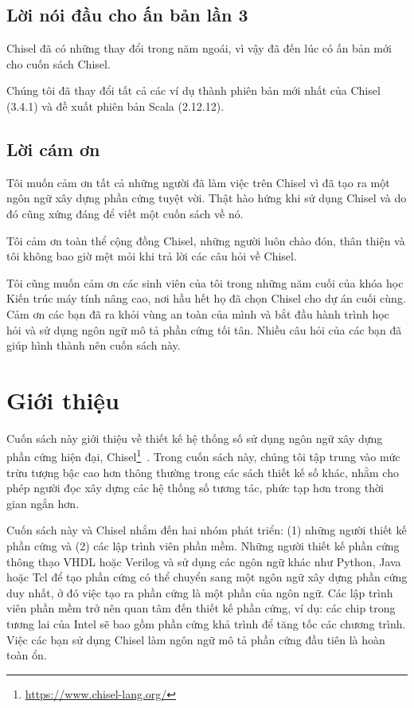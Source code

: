 \documentclass[%
    10pt,
    headinclude, footexclude,
    openright, %
    notitlepage,
    cleardoubleempty,
    headsepline,
    pointlessnumbers,
    bibtotoc, idxtotoc,
    ]{scrbook}
\newcommand{\myref}[2]{\href{#1}{#2}}
\renewcommand{\myref}[2]{{#2}{\footnote{\url{#1}}}}
\begin{document}
\section*{Lời nói đầu cho ấn bản lần 3}

Chisel đã có những thay đổi trong năm ngoái, vì vậy đã đến lúc có ấn bản mới cho cuốn sách Chisel.

Chúng tôi đã thay đổi tất cả các ví dụ thành phiên bản mới nhất của Chisel (3.4.1) và đề xuất phiên bản Scala (2.12.12).

\section*{Lời cám ơn}

Tôi muốn cảm ơn tất cả những người đã làm việc trên Chisel vì đã tạo ra một ngôn ngữ xây dựng phần cứng tuyệt vời. Thật hào hứng khi sử dụng Chisel và do đó cũng xứng đáng để viết một cuốn sách về nó.

Tôi cảm ơn toàn thể cộng đồng Chisel, những người luôn chào đón, thân thiện và tôi không bao giờ mệt mỏi khi trả lời các câu hỏi về Chisel. 

Tôi cũng muốn cảm ơn các sinh viên của tôi trong những năm cuối của khóa học Kiến trúc máy tính nâng cao, nơi hầu hết họ đã chọn Chisel cho dự án cuối cùng.
Cảm ơn các bạn đã ra khỏi vùng an toàn của mình và bắt đầu hành trình học hỏi và sử dụng ngôn ngữ mô tả phần cứng tối tân. Nhiều câu hỏi của các bạn đã giúp hình thành nên cuốn sách này.

\mainmatter

\chapter{Giới thiệu}
\label{sec:intro}

Cuốn sách này giới thiệu về thiết kế hệ thống số sử dụng ngôn ngữ xây dựng phần cứng hiện đại, 
\myref{https://www.chisel-lang.org/}{Chisel}~\cite{chisel:dac2012}.
Trong cuốn sách này, chúng tôi tập trung vào mức trừu tượng bậc cao hơn thông thường trong các sách thiết kế số khác, nhằm cho phép người đọc xây dựng các hệ thống số tương tác, phức tạp hơn trong thời gian ngắn hơn.

Cuốn sách này và Chisel nhắm đến hai nhóm phát triển: 
(1) những người thiết kế phần cứng và (2) các lập trình viên phần mềm.
Những người thiết kế phần cứng thông thạo VHDL hoặc Verilog và sử dụng các ngôn ngữ khác như Python, Java hoặc Tcl để tạo phần cứng có thể chuyển sang một ngôn ngữ xây dựng phần cứng duy nhất, ở đó việc tạo ra phần cứng là một phần của ngôn ngữ.
Các lập trình viên phần mềm trở nên quan tâm đến thiết kế phần cứng, ví dụ: các chip trong tương lai của Intel sẽ bao gồm phần cứng khả trình để tăng tốc các chương trình.
Việc các bạn sử dụng Chisel làm ngôn ngữ mô tả phần cứng đầu tiên là hoàn toàn ổn.
\end{document}
